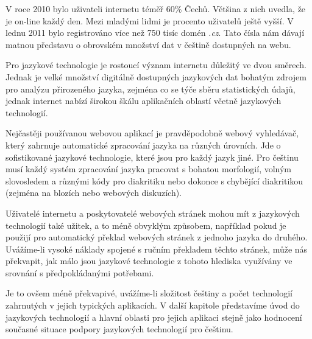 \begin{multicols}{2}
V roce 2010 bylo uživateli internetu téměř 60\% Čechů. Většina z nich uvedla, že je on-line každý den. Mezi mladými lidmi je procento uživatelů ještě vyšší. V lednu 2011 bylo registrováno více než 750 tisíc domén \emph{.cz}. Tato čísla nám dávají matnou představu o obrovském množství dat v češtině dostupných na webu.

Pro jazykové technologie je rostoucí význam internetu důležitý ve dvou směrech. Jednak je velké množství digitálně dostupných jazykových dat bohatým zdrojem pro analýzu přirozeného jazyka, zejména co se týče sběru statistických údajů, jednak internet nabízí širokou škálu aplikačních oblastí včetně jazykových technologií.

Nejčastěji používanou webovou aplikací je pravděpodobně webový vyhledávač, který zahrnuje automatické zpracování jazyka na různých úrovních. Jde o sofistikované jazykové technologie, které jsou pro každý jazyk jiné. Pro češtinu musí každý systém zpracování jazyka pracovat s bohatou morfologií, volným slovosledem a různými kódy pro diakritiku nebo dokonce s chybějící diakritikou (zejména na blozích nebo webových diskuzích).

Uživatelé internetu a poskytovatelé webových stránek mohou mít z jazykových technologií také užitek, a to méně obvyklým způsobem, například pokud je použijí pro automatický překlad webových stránek z jednoho jazyka do druhého. Uvážíme-li vysoké náklady spojené s ručním překladem těchto stránek, může nás překvapit, jak málo jsou jazykové technologie z tohoto hlediska využívány ve srovnání s předpokládanými potřebami.

Je to ovšem méně překvapivé, uvážíme-li složitost češtiny a počet technologií zahrnutých v jejich typických aplikacích. V další kapitole představíme úvod do jazykových technologií a hlavní oblasti pro jejich aplikaci stejně jako hodnocení současné situace podpory jazykových technologií pro češtinu.
\end{multicols}
\clearpage

